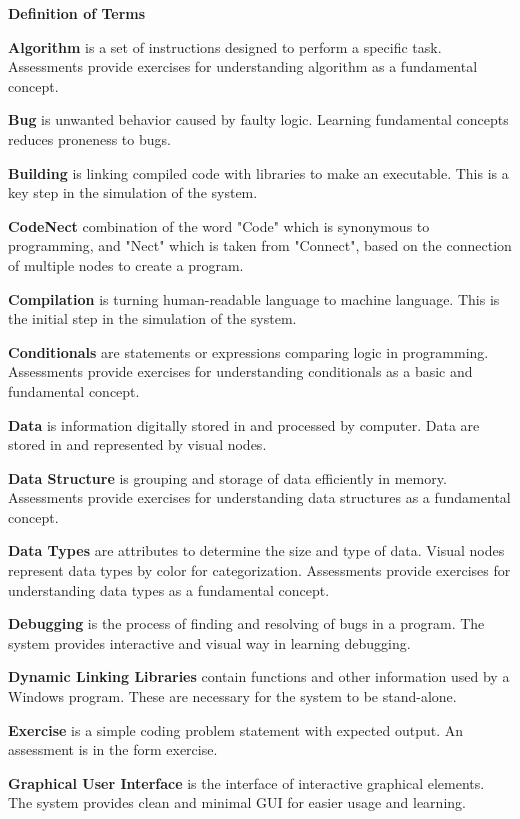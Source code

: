 \flushleft
\textbf{Definition of Terms}\\
\justifying

\parx
\textbf{Algorithm} is a set of instructions designed to perform a specific task.
Assessments provide exercises for understanding algorithm as a fundamental concept.

\parx
\textbf{Bug} is unwanted behavior caused by faulty logic. Learning fundamental
concepts reduces proneness to bugs.

\parx
\textbf{Building} is linking compiled code with libraries to make an executable.
This is a key step in the simulation of the system.

\parx
\textbf{CodeNect} combination of the word "Code" which is synonymous to
programming, and "Nect" which is taken from "Connect", based on the connection
of multiple nodes to create a program.

\parx
\textbf{Compilation} is turning human-readable language to machine language.
This is the initial step in the simulation of the system.

\parx
\textbf{Conditionals} are statements or expressions comparing logic in
programming.  Assessments provide exercises for understanding conditionals as a
basic and fundamental concept.

\parx
\textbf{Data} is information digitally stored in and processed by computer.
Data are stored in and represented by visual nodes.

\parx
\textbf{Data Structure} is grouping and storage of data efficiently in memory.
Assessments provide exercises for understanding data structures as a fundamental concept.

\parx
\textbf{Data Types} are attributes to determine the size and type of data.
Visual nodes represent data types by color for categorization.
Assessments provide exercises for understanding data types as a fundamental concept.

\parx
\textbf{Debugging} is the process of finding and resolving of bugs in a program.
The system provides interactive and visual way in learning debugging.

\parx
\textbf{Dynamic Linking Libraries} contain functions and other information used
by a Windows program. These are necessary for the system to be stand-alone.

\parx
\textbf{Exercise} is a simple coding problem statement with expected output.
An assessment is in the form exercise.

\parx
\textbf{Graphical User Interface} is the interface of interactive graphical elements.
The system provides clean and minimal GUI for easier usage and learning.

